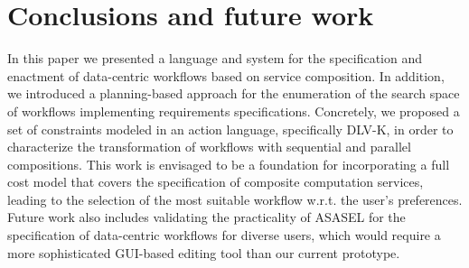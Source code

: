 
\section{Conclusions and future work} \label{sec:conclusions}

In this paper we presented a language and system for the specification and enactment of data-centric workflows based on service composition. In addition, we introduced a planning-based approach for the enumeration of the search space of workflows implementing requirements specifications. Concretely, we proposed a set of constraints modeled in an action language, specifically DLV-K, in order to characterize the transformation of workflows with sequential and parallel compositions. This work is envisaged to be a foundation for incorporating a full cost model that covers the specification of composite computation services, leading to the selection of the most suitable workflow w.r.t. the user's preferences. Future work also includes validating the practicality of ASASEL for the specification of data-centric workflows for diverse users, which would require a more sophisticated GUI-based editing tool than our current prototype. 
